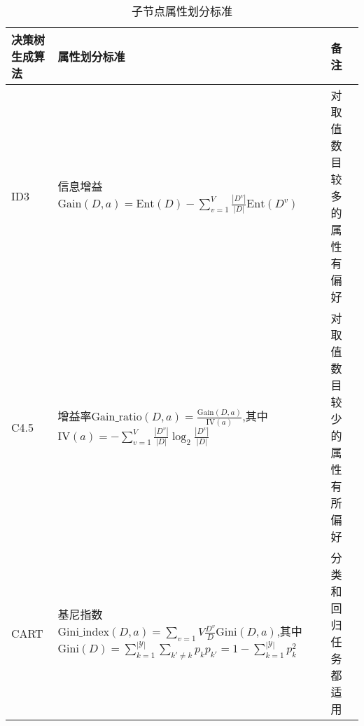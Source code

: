 \begin{table}[bht]
    \caption{子节点属性划分标准}
    \centering
    \begin{tabular}{|p{3cm}|p{6.5cm}|p{2.5cm}|}
    \hline
        决策树生成算法&属性划分标准&备注\\
    \hline
        ID3&信息增益$\text{Gain}(D,a)=\text{Ent}(D)-\sum_{v=1}^V\frac{|D^v|}{|D|}\text{Ent}(D^v)$&对取值数目较多的属性有偏好\\
    \hline
        C4.5&增益率$\text{Gain\_ratio}(D,a)=\frac{\text{Gain}(D,a)}{\text{IV}(a)}$,其中$\text{IV}(a)=-\sum_{v=1}^V\frac{|D^v|}{|D|}\log_2\frac{|D^v|}{|D|}$&对取值数目较少的属性有所偏好\\
    \hline
        CART&基尼指数$\text{Gini\_index}(D,a)=\sum_{v=1}{V}\frac{D^v}{D}\text{Gini}(D,a)$,其中$\text{Gini}(D)=\sum_{k=1}^{|\mathcal Y|}\sum_{k'\ne k}p_kp_{k'}=1-\sum_{k=1}^{|\mathcal Y|}p_k^2$&分类和回归任务都适用\\
    \hline
    \end{tabular}
\end{table}
